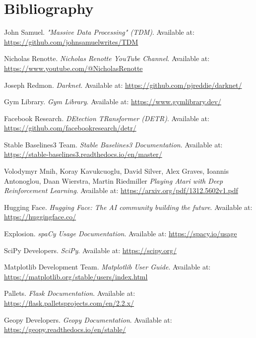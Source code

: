 \documentclass{article}
\begin{document}
    \newpage


    \section{Bibliography}\label{sec:bibliography}

    \begin{thebibliography}{9}

        John Samuel.
        \textit{"Massive Data Processing" (TDM)}.
        Available at: \url{https://github.com/johnsamuelwrites/TDM}

        Nicholas Renotte.
        \textit{Nicholas Renotte YouTube Channel}.
        Available at: \url{https://www.youtube.com/@NicholasRenotte}

        Joseph Redmon.
        \textit{Darknet}.
        Available at: \url{https://github.com/pjreddie/darknet/}

        Gym Library.
        \textit{Gym Library}.
        Available at: \url{https://www.gymlibrary.dev/}

        Facebook Research.
        \textit{DEtection TRansformer (DETR)}.
        Available at: \url{https://github.com/facebookresearch/detr/}

        Stable Baselines3 Team.
        \textit{Stable Baselines3 Documentation}.
        Available at: \url{https://stable-baselines3.readthedocs.io/en/master/}

        Volodymyr Mnih, Koray Kavukcuoglu, David Silver, Alex Graves, Ioannis Antonoglou, Daan Wierstra, Martin Riedmiller
        \textit{Playing Atari with Deep Reinforcement Learning}.
        Available at: \url{https://arxiv.org/pdf/1312.5602v1.pdf}

        Hugging Face.
        \textit{Hugging Face: The AI community building the future}.
        Available at: \url{https://huggingface.co/}

        Explosion.
        \textit{spaCy Usage Documentation}.
        Available at: \url{https://spacy.io/usage}

        SciPy Developers.
        \textit{SciPy}.
        Available at: \url{https://scipy.org/}

        Matplotlib Development Team.
        \textit{Matplotlib User Guide}.
        Available at: \url{https://matplotlib.org/stable/users/index.html}

        Pallets.
        \textit{Flask Documentation}.
        Available at: \url{https://flask.palletsprojects.com/en/2.2.x/}

        Geopy Developers.
        \textit{Geopy Documentation}.
        Available at: \url{https://geopy.readthedocs.io/en/stable/}

    \end{thebibliography}
\end{document}
